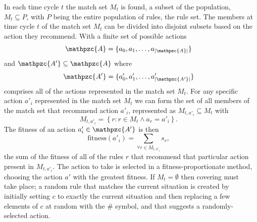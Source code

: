 In each time cycle $t$ the match set $M_t$ is found, a subset of the population,
$M_t \subseteq P$,
with $P$ being the entire population of rules, the rule set.
The members at time cycle $t$ of the match set $M_t$ can be divided into disjoint subsets based on the action they recommend.
With a finite set of possible actions
\begin{equation}
\mathpzc{A} = \{a_0, a_1, \ldots, a_{|\mathpzc{A}|}\}
\end{equation}
and $\mathpzc{A'} \subseteq \mathpzc{A}$ where
\begin{equation}
\mathpzc{A'} = \{a'_0, a'_1, \ldots, a'_{|\mathpzc{A'}|}\}
\end{equation}
comprises all of the actions represented in the match set $M_t$.
For any specific action $a'_i$ represented in the match set $M_t$ we can form the set of all members of the match set that recommend action $a'_i$, represented as
$M_{t,a'_i} \subseteq M_t$ with
\begin{equation}
M_{t,a'_i} = \left\{ r \colon r \in M_t \land a_r = a'_i \right\}.
\end{equation}
The fitness of an action $a'_i \in \mathpzc{A'}$ is then
\begin{equation}
\mathrm{fitness}(a'_i) = \sum_{\forall r \in M_{t,a'_i}} s_r,
\end{equation}
the sum of the fitness of all of the rules $r$ that recommend that particular action present in $M_{t,a'_i}$.
The action to take is selected in a fitness-proportionate method,
choosing the action $a'$ with the greatest fitness.
If $M_t = \emptyset$ then covering must take place;
a random rule that matches the current situation is created by initially setting $c$ to exactly the current situation and then replacing a few elements of $c$ at random with the \# symbol, and that suggests a randomly-selected action.

